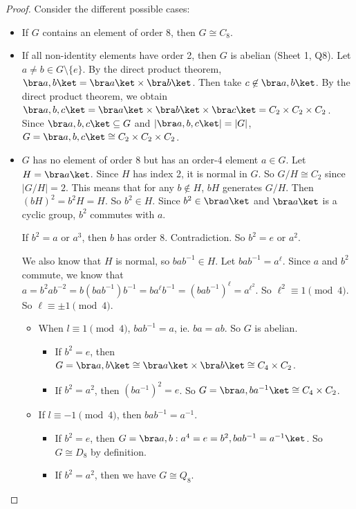 \documentclass[a4paper]{article}
\begin{document}
\begin{proof}
  Consider the different possible cases:
  \begin{itemize}
    \item If $G$ contains an element of order 8, then $G\cong C_8$.
    \item If all non-identity elements have order 2, then $G$ is abelian (Sheet 1, Q8). Let $a\not= b\in G\setminus\{e\}$. By the direct product theorem, $\bra a, b\ket = \bra a\ket\times\bra b\ket$. Then take $c\not\in \bra a, b\ket$. By the direct product theorem, we obtain $\bra a, b, c\ket = \bra a\ket\times\bra b\ket\times\bra c\ket = C_2\times C_2\times C_2$. Since $\bra a, b, c\ket\subseteq G$ and $|\bra a, b, c\ket| = |G|$, $G = \bra a, b, c\ket \cong C_2\times C_2\times C_2$.
    \item $G$ has no element of order 8 but has an order-4 element $a\in G$. Let $H = \bra a\ket$. Since $H$ has index 2, it is normal in $G$. So $G/H \cong C_2$ since $|G/H| = 2$. This means that for any $b\not\in H$, $bH$ generates $G/H$. Then $(bH)^2 = b^2H = H$. So $b^2\in H$. Since $b^2\in \bra a\ket$ and $\bra a\ket$ is a cyclic group, $b^2$ commutes with $a$.

      If $b^2 = a$ or $a^3$, then $b$ has order 8. Contradiction. So $b^2 = e$ or $a^2$.

      We also know that $H$ is normal, so $bab^{-1}\in H$. Let $bab^{-1} = a^\ell$. Since $a$ and $b^2$ commute, we know that $a = b^2 ab^{-2}  = b(bab^{-1})b^{-1} = ba^\ell b^{-1} = (bab^{-1})^{\ell} = a^{\ell^2}$. So $\ell^2 \equiv 1\pmod 4$. So $\ell \equiv \pm 1 \pmod 4$.

      \begin{itemize}
        \item When $l\equiv 1\pmod 4$, $bab^{-1} = a$, ie. $ba = ab$. So $G$ is abelian.
          \begin{itemize}
            \item  If $b^2 = e$, then $G = \bra a, b\ket \cong \bra a\ket \times \bra b\ket \cong C_4\times C_2$.
            \item If $b^2 = a^2$, then $(ba^{-1})^2 = e$. So $G = \bra a, ba^{-1}\ket \cong C_4\times C_2$.
          \end{itemize}
        \item If $l \equiv -1\pmod 4$, then $bab^{-1} = a^{-1}$.
          \begin{itemize}
            \item If $b^2 = e$, then $G = \bra a, b: a^4 = e = b^2, bab^{-1} = a^{-1}\ket$. So $G\cong D_8$ by definition.
            \item If $b^2 = a^2$, then we have $G\cong Q_8$.
          \end{itemize}
      \end{itemize}
  \end{itemize}
\end{proof}
\end{document}
